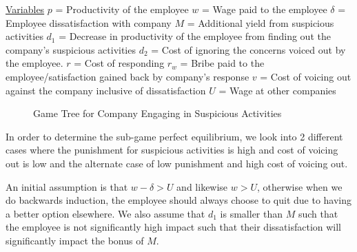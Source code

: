 \documentclass[a4paper, 12pt]{article}
\begin{document}
\underline{Variables}
\newline
$p$ = Productivity of the employee
\newline
$w$ = Wage paid to the employee
\newline
$\delta$ = Employee dissatisfaction with company
\newline
$M$ = Additional yield from suspicious activities
\newline
$d_1$ = Decrease in productivity of the employee from finding out the company's suspicious activities 
\newline
$d_2$ = Cost of ignoring the concerns voiced out by the employee.
\newline
$r$ = Cost of responding
\newline
$r_w$ = Bribe paid to the employee/satisfaction gained back by company's response
\newline
$v$ = Cost of voicing out against the company inclusive of dissatisfaction
\newline
$U$ = Wage at other companies
\begin{figure}[H]
\begin{center}
\end{center}
\caption{Game Tree for Company Engaging in Suspicious Activities}
\end{figure}

In order to determine the sub-game perfect equilibrium, we look into 2 different cases where the punishment for suspicious activities is high and cost of voicing out is low and the alternate case of low punishment and high cost of voicing out. 

An initial assumption is that $w-\delta > U$ and likewise $w > U$, otherwise when we do backwards induction, the employee should always choose to quit due to having a better option elsewhere. We also assume that $d_1$ is smaller than $M$ such that the employee is not significantly high impact such that their dissatisfaction will significantly impact the bonus of $M$.
\end{document}
